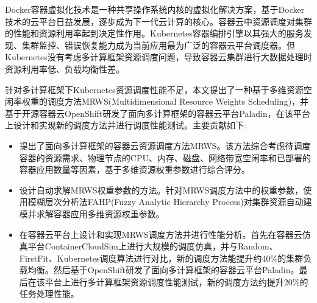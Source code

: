 \begin{cabstract}
  Docker容器虚拟化技术是一种共享操作系统内核的虚拟化解决方案，基于Docker技术的云平台日益发展，逐步成为下一代云计算的核心。容器云中资源调度对集群的性能和资源利用率起到决定性作用。Kubernetes容器编排引擎以其强大的服务发现、集群监控、错误恢复能力成为当前应用最为广泛的容器云平台调度器。但Kubernetes没有考虑多计算框架资源调度问题，导致容器云集群进行大数据处理时资源利用率低、负载均衡性差。
  
  针对多计算框架下Kubernetes资源调度性能不足，本文提出了一种基于多维资源空闲率权重的调度方法MRWS(Multidimensional Resource Weights Scheduling)，并基于开源容器云OpenShift研发了面向多计算框架的容器云平台Paladin，在该平台上设计和实现新的调度方法并进行调度性能测试。主要贡献如下:
  \begin{itemize}
  	\item 提出了面向多计算框架的容器云资源调度方法MRWS。该方法综合考虑待调度容器的资源需求、物理节点的CPU、内存、磁盘、网络带宽空闲率和已部署的容器应用数量等因素，基于多维资源权重参数进行综合评分。
  	\item 设计自动求解MRWS权重参数的方法。针对MRWS调度方法中的权重参数，使用模糊层次分析法FAHP(Fuzzy Analytic Hierarchy Process)对集群资源自动建模并求解容器应用多维资源权重参数。
  	\item 在容器云平台上设计和实现MRWS调度方法并进行性能分析。首先在容器云仿真平台ContainerCloudSim上进行大规模的调度仿真，并与Random、FirstFit、Kubernetes调度算法进行对比，新的调度方法能提升约40\%的集群负载均衡。然后基于OpenShift研发了面向多计算框架的容器云平台Paladin。最后在该平台上进行多计算框架资源调度性能测试，新的调度方法约提升20\%的任务处理性能。
  \end{itemize}
\end{cabstract}


